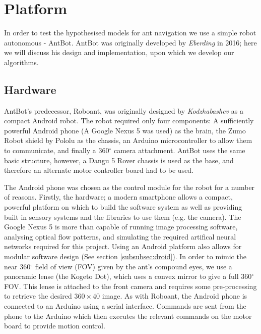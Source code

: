 \documentclass[a4paper,12pt]{article}
\begin{document}
\section{ Platform } \label{sec:platform}
In order to test the hypothesised models for ant navigation we use a simple robot autonomous - AntBot.
AntBot was originally developed by \textit{Eberding} in 2016; here we will discuss his design and
implementation, upon which we develop our algorithms.

\subsection{ Hardware }
AntBot's predecessor, Roboant, was originally designed by \textit{Kodzhabashev} \cite{Kodzhabashev2014}
as a compact Android robot. The robot required only four components: A sufficiently powerful Android
phone (A Google Nexus 5 was used) as the brain, the Zumo Robot shield by Pololu as the chassis,
an Arduino microcontroller to allow them to communicate, and finally a 360$^{\circ}$ camera attachment.
AntBot uses the same basic structure, however, a Dangu 5 Rover chassis is used as the base, and
therefore an alternate motor controller board had to be used.
\newline

The Android phone was chosen as the control module for the robot for a number of reasons. Firstly,
the hardware; a modern smartphone allows a compact, powerful platform on which to build the
software system as well as providing built in sensory systems and the libraries to use them (e.g. the
camera). The Google Nexus 5 is more than capable of running image processing software, analysing
optical flow patterns, and simulating the required artifical neural networks required for this project.
Using an Android platform also allows for modular software design (See section \ref{subsubsec:droid}).
In order to mimic the near 360$^{\circ}$ field of view (FOV) given by the ant's compound eyes, we use a
panoramic lense (the Kogeto Dot), which uses a convex mirror to give a full 360$^{\circ}$ FOV. This
lense is attached to the front camera and requires some pre-processing to retrieve the desired
$360\times40$ image. As with Roboant, the Android phone is connected to an Arduino using a serial
interface. Commands are sent from the phone to the Arduino which then executes the relevant commands
on the motor board to provide motion control.
\end{document}
